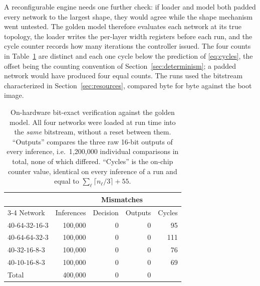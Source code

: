 \documentclass[final,5p,times,twocolumn]{elsarticle}
\begin{document}
A reconfigurable engine needs one further check: if loader and model both
padded every network to the largest shape, they would agree while the shape
mechanism went untested. The golden model therefore evaluates each network at
its true topology, the loader writes the per-layer width registers before each
run, and the cycle counter records how many iterations the controller issued.
The four counts in Table~\ref{tab:verification} are distinct and each one cycle
below the prediction of \eqref{eq:cycles}, the offset being the counting
convention of Section~\ref{sec:determinism}; a padded network would have
produced four equal counts. The runs used the bitstream characterized in
Section~\ref{sec:resources}, compared byte for byte against the boot image.

\begin{table}[htbp]
\centering
\caption{On-hardware bit-exact verification against the golden model. All four
networks were loaded at run time into the \emph{same} bitstream, without a
reset between them. ``Outputs'' compares the three raw 16-bit outputs of every
inference, i.e.\ 1{,}200{,}000 individual comparisons in total, none of which
differed. ``Cycles'' is the on-chip counter value, identical on every inference
of a run and equal to $\sum_\ell \lceil n_\ell/3\rceil + 55$.}
\label{tab:verification}
\small
\begin{tabular}{@{}lrrrr@{}}
\toprule
 & & \multicolumn{2}{c}{Mismatches} & \\
\cmidrule(lr){3-4}
Network & Inferences & Decision & Outputs & Cycles \\
\midrule
$40$-$64$-$32$-$16$-$3$ & 100{,}000 & 0 & 0 & 95 \\
$40$-$64$-$64$-$32$-$3$ & 100{,}000 & 0 & 0 & 111 \\
$40$-$32$-$16$-$8$-$3$  & 100{,}000 & 0 & 0 & 76 \\
$40$-$10$-$16$-$8$-$3$  & 100{,}000 & 0 & 0 & 69 \\
\midrule
Total                   & 400{,}000 & 0 & 0 & \\
\bottomrule
\end{tabular}
\end{table}
\end{document}
